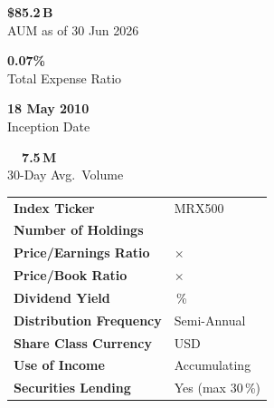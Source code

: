 \documentclass[11pt,a4paper]{article}
\makeatletter
\renewcommand{\arraystretch}{1.15}
\newcommand{\keyvaltable}[1]{%
  \bgroup
  \setlength{\parindent}{0pt}%
  \setlength{\parskip}{0pt}%
  \renewcommand{\arraystretch}{1.35}%
  \begin{tabularx}{\linewidth}{@{}>{\color{navy}\bfseries}l@{\hspace{6mm}}>{\raggedright\arraybackslash}X@{}}
    #1
  \end{tabularx}%
  \egroup
}
\newcommand{\statval}[1]{{\fontsize{22}{26}\selectfont\bfseries\color{gold}#1}}
\newcommand{\statlabel}[1]{{\footnotesize\color{white!85}#1}}
\makeatother
\begin{document}
\hfill
\begin{minipage}[t]{0.35\linewidth}

\vspace{-0.4em}
\begin{statcard}
  \centering
  \statval{\$85.2\,B}\\[2pt]
  \statlabel{AUM as of 30 Jun 2026}

  \vspace{6pt}
  \statval{0.07\%}\\[2pt]
  \statlabel{Total Expense Ratio}

  \vspace{6pt}
  \statval{18 May 2010}\\[2pt]
  \statlabel{Inception Date}

  \vspace{6pt}
  \statval{\faChartBar\ \ 7.5\,M}\\[2pt]
  \statlabel{30-Day Avg.\ Volume}
\end{statcard}

\vspace{8pt}

\begin{factbox}
\footnotesize
\keyvaltable{
  Index Ticker              & MRX500 \\
  Number of Holdings        & 503 \\
  Price/Earnings Ratio      & 22.4$\times$ \\
  Price/Book Ratio          & 4.6$\times$ \\
  Dividend Yield            & 1.32\,\% \\
  Distribution Frequency    & Semi-Annual \\
  Share Class Currency      & USD \\
  Use of Income             & Accumulating \\
  Securities Lending        & Yes (max 30\,\%) \\
}
\end{factbox}

\end{minipage}

\vspace{4pt}

\end{document}
